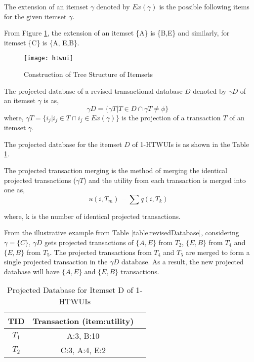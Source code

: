 \documentclass[11pt,openright]{report}
\begin{document}
\begin{definition}
The extension of an itemset $\gamma$ denoted by $Ex(\gamma)$ is the possible following items for the given itemset $\gamma$.
\end{definition}
From Figure \ref{fig:htwui_tree_structure}, the extension of an itemset \{A\} is \{B,E\} and similarly, for itemset \{C\} is \{A, E,B\}.

\begin{figure}
	\centering
	\texttt{[image: htwui]}
	\caption{Construction of Tree Structure of Itemsets}
	\label{fig:htwui_tree_structure}
\end{figure}

\bigskip
\begin{definition}
The projected database of a revised transactional database $D$ denoted by ${\gamma}D$ of an itemset $\gamma$ is as, 	
	\begin{equation}
	{\gamma}D = \{ {\gamma}T|T \in D \cap {\gamma}T \ne \phi\}\
	\end{equation}	
	where, ${\gamma}T = \{i_j|i_j \in T \cap i_j \in Ex(\gamma)\}$ is the projection of a transaction $T$ of an itemset $\gamma$.
\end{definition}
The projected database for the itemset $D$ of 1-HTWUIs is as shown in the Table \ref{table:projectedtransactionDB}.

\begin{definition}
		The projected transaction merging is the method of merging the identical projected transactions (${\gamma}T$) and the utility from each transaction is merged into one as,
	\begin{equation}
	u(i,T_m) = \sum q(i,T_k)
	\end{equation}
	
	where, k is the number of identical projected transactions.
\end{definition}
From the illustrative example from Table \ref{table:revisedDatabase}, considering $\gamma = \{C\}$,  ${\gamma}D$ gets projected transactions of $\{A,E\}$ from $T_2$, $\{E,B\}$ from $T_4$ and $\{E,B\}$ from $T_5$. The projected transactions from $T_4$ and $T_5$ are merged to form a single projected transaction in the ${\gamma}D$ database. As a result, the new projected database will have $\{A,E\}$ and $\{E,B\}$ transactions.

\begin{table}
	\renewcommand{\arraystretch}{1.3}
	\caption{Projected Database for Itemset D of 1-HTWUIs}
	\label{table:projectedtransactionDB}
	\centering
	\begin{tabular}{|c||c||c|}
		\hline
		\bfseries TID & \bfseries Transaction (item:utility)\\
		\hline\hline
		$T_1$ & A:3, B:10\\ \hline
		$T_2$ & C:3, A:4, E:2\\ \hline
	\end{tabular}
\end{table}
\end{document}
